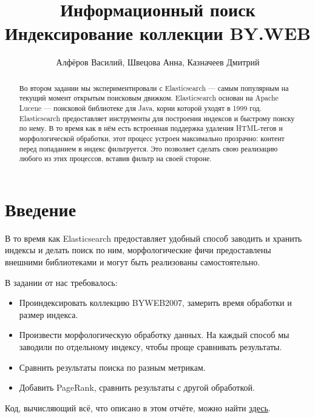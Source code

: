 \documentclass[twocolumn]{extarticle}
\title{Информационный поиск\\ Индексирование коллекции BY.WEB}
\author{Алфёров Василий, Швецова Анна, Казначеев Дмитрий}
\begin{document}
\maketitle

\begin{abstract}
    Во втором задании мы экспериментировали с Elasticsearch — самым популярным на текущий момент открытым поисковым движком. Elasticsearch основан на Apache Lucene — поисковой библиотеке для Java, корни которой уходят в 1999 год. Elasticsearch предоставляет инструменты для построения индексов и быстрому поиску по нему. В то время как в нём есть встроенная поддержка удаления HTML-тегов и морфологической обработки, этот процесс устроен максимально прозрачно: контент перед попаданием в индекс фильтруется. Это позволяет сделать свою реализацию любого из этих процессов, вставив фильтр на своей стороне.
\end{abstract}

\section{Введение}

В то время как Elasticsearch предоставляет удобный способ заводить и хранить индексы и делать поиск по ним, морфологические фичи предоставлены внешними библиотеками и могут быть реализованы самостоятельно.

В задании от нас требовалось:

\begin{itemize}
\item Проиндексировать коллекцию BYWEB2007, замерить время обработки и размер индекса.
\item Произвести морфологическую обработку данных. На каждый способ мы заводили по отдельному индексу, чтобы проще сравнивать результаты.
\item Сравнить результаты поиска по разным метрикам.
\item Добавить PageRank, сравнить результаты с другой обработкой.
\end{itemize}

Код, вычисляющий всё, что описано в этом отчёте, можно найти
\href{https://github.com/vasalf/hse-web-search-homework/tree/master/2}{здесь}.






\end{document}
